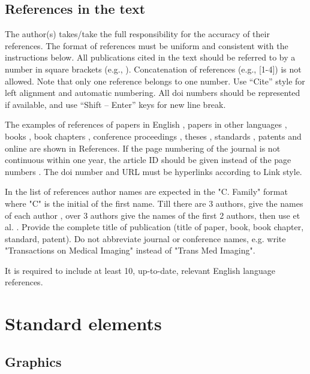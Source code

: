 \documentclass[10pt,a5paper]{article}
\begin{document}
\subsection{References in the text}

The author(s) takes/take the full responsibility for the accuracy of their references. The format of references must be uniform and consistent with the instructions below. All publications cited in the text should be referred to by a number in square brackets (e.g., \cite{article_a}). Concatenation of references (e.g., [1-4]) is not allowed. Note that only one reference belongs to one number. Use “Cite” style for left alignment and automatic numbering. All doi numbers should be represented if available, and use “Shift – Enter” keys for new line break.

The examples of references of papers in English \cite{article_a}, papers in other languages \cite{article_b}, books \cite{book}, book chapters \cite{incollection}, conference proceedings \cite{conference}, theses \cite{phdthesis}, standards \cite{standard}, patents \cite{patent} and online \cite{online} are shown in References. If the page numbering of the journal is not continuous within one year, the article ID should be given instead of the page numbers \cite{article_c}. The doi number and URL must be hyperlinks \cite{article_a} \cite{book} \cite{conference} according to Link style.

In the list of references author names are expected in the "C. Family" format where "C" is the initial of the first name. Till there are 3 authors, give the names of each author \cite{article_b}, over 3 authors give the names of the first 2 authors, then use et al. \cite{article_d}. Provide the complete title of publication (title of paper, book, book chapter, standard, patent). Do not abbreviate journal or conference names, e.g. write "Transactions on Medical Imaging" instead of "Trans Med Imaging".

It is required to include at least 10, up-to-date, relevant English language references.



\section{Standard elements}

\subsection{Graphics}
\end{document}
